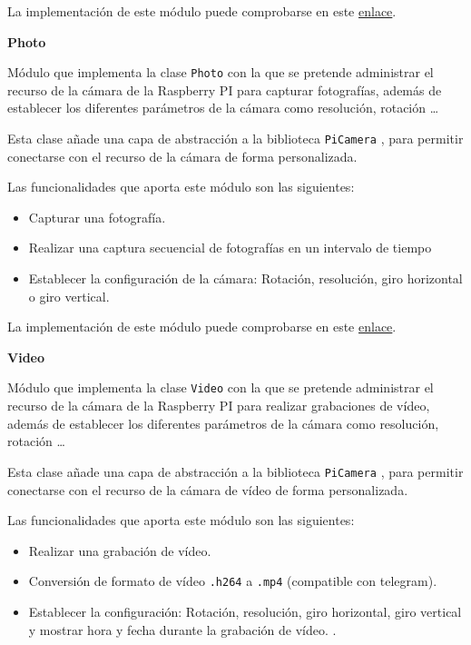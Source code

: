 La implementación de este módulo puede comprobarse en este \href{https://github.com/jmv74211/TFM_security_system_PI/blob/master/src/modules/logger.py}{enlace}.

\textbf{Photo} 

Módulo que implementa la clase \texttt{Photo} con la que se pretende administrar el recurso de la cámara de la Raspberry PI para capturar fotografías, además de establecer los diferentes parámetros de la cámara como resolución, rotación \ldots

Esta clase añade una capa de abstracción a la biblioteca \texttt{PiCamera} \cite{ref12}, para permitir conectarse con el recurso de la cámara de forma personalizada.

Las funcionalidades que aporta este módulo son las siguientes:

\vspace{-0.5cm}

\begin{itemize}
\item Capturar una fotografía.
\item Realizar una captura secuencial de fotografías en un intervalo de tiempo
\item Establecer la configuración de la cámara: Rotación, resolución, giro horizontal o giro vertical.

\end{itemize}

\vspace{-0.5cm}

La implementación de este módulo puede comprobarse en este \href{https://github.com/jmv74211/TFM_security_system_PI/blob/master/src/modules/photo.py}{enlace}.

\textbf{Video} 

Módulo que implementa la clase \texttt{Video} con la que se pretende administrar el recurso de la cámara de la Raspberry PI para realizar grabaciones de vídeo, además de establecer los diferentes parámetros de la cámara como resolución, rotación \ldots

Esta clase añade una capa de abstracción a la biblioteca \texttt{PiCamera} \cite{ref12}, para permitir conectarse con el recurso de la cámara de vídeo de forma personalizada.

Las funcionalidades que aporta este módulo son las siguientes:

\vspace{-0.5cm}

\begin{itemize}
\item Realizar una grabación de vídeo.
\item Conversión de formato de vídeo \texttt{.h264} a \texttt{.mp4} (compatible con telegram).
\item Establecer la configuración: Rotación, resolución, giro horizontal, giro vertical y mostrar hora y fecha durante la grabación de vídeo. .

\end{itemize}

